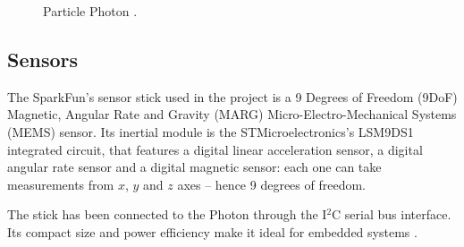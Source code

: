 \begin{center}
	\begin{figure}[ht!]
		\caption{Particle Photon \cite{Photon}.}
	\end{figure}
\end{center}

\subsection{Sensors}
The SparkFun's sensor stick used in the project is a 9 Degrees of Freedom (9DoF) Magnetic, Angular Rate and Gravity (MARG) Micro-Electro-Mechanical Systems (MEMS) sensor. Its inertial module is the STMicroelectronics's LSM9DS1 integrated circuit, that features a digital linear acceleration sensor, a digital angular rate sensor and a digital magnetic sensor: each one can take measurements from $x$, $y$ and $z$ axes – hence 9 degrees of freedom.

The stick has been connected to the Photon through the I$^2$C serial bus interface. Its compact size and power efficiency make it ideal for embedded systems \cite{SensorDatasheet}.

